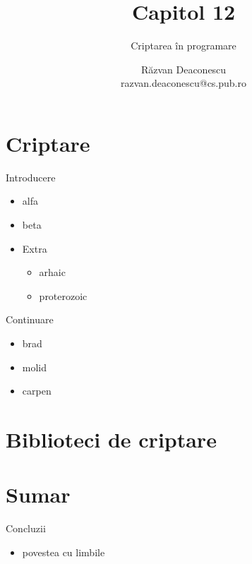 \documentclass{training}
\title[Capitol 12]{Capitol 12}
\subtitle{Criptarea în programare}
\author[Răzvan]{Răzvan Deaconescu\\razvan.deaconescu@cs.pub.ro}
\date{}
\begin{document}
\frame{\titlepage}

\frame{\tableofcontents}

\section{Criptare}

\begin{frame}{Introducere}
  \begin{itemize}
    \item alfa
    \item beta
    \item Extra
      \begin{itemize}
        \item arhaic
        \item proterozoic
      \end{itemize}
  \end{itemize}
\end{frame}

\begin{frame}{Continuare}
  \begin{itemize}
    \item brad
    \item molid
    \item carpen
  \end{itemize}
\end{frame}

\section{Biblioteci de criptare}

\section{Sumar}

\begin{frame}{Concluzii}
  \begin{itemize}
    \item povestea cu limbile
  \end{itemize}
\end{frame}
\end{document}

